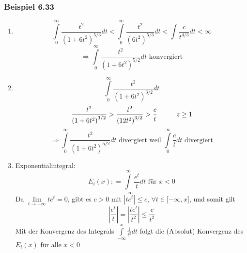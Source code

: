 \subsubsection*{Beispiel 6.33}
\begin{enumerate}
\item \[\int\limits_0^\infty  {\frac{{{t^2}}}{{{{\left( {1 + 6{t^2}} \right)}^{5/3}}}}dt}  < \int\limits_0^\infty  {\frac{{{t^2}}}{{{{\left( {6{t^2}} \right)}^{5/3}}}}dt}  < \int {\frac{c}{{{t^{4/3}}}}dt < \infty } \]
$$\Rightarrow\int\limits_0^\infty  {\frac{{{t^2}}}{{{{\left( {1 + 6{t^2}} \right)}^{5/2}}}}dt} \text{ konvergiert}$$
\item \[\int\limits_0^\infty  {\frac{{{t^2}}}{{{{\left( {1 + 6{t^2}} \right)}^{3/2}}}}dt} \]   
\[\frac{{{t^2}}}{{{{\left( {1 + 6{t^2}} \right)}^{3/2}}}} > \frac{{{t^2}}}{{{{\left( {12{t^2}} \right)}^{3/2}}}} > \frac{c}{t}\text{\hspace{10mm}}z\geq 1\]
\[\Rightarrow\int\limits_0^\infty  {\frac{{{t^2}}}{{{{\left( {1 + 6{t^2}} \right)}^{5/2}}}}} dt\text{ divergiert weil }\int\limits_0^\infty  {\frac{c}{t}} dt\text{ divergiert}\]
\item Exponentialintegral:
\[{E_i}(x): = \int\limits_{ - \infty }^\infty  {\frac{{{e^t}}}{t}dt} \text{ für }x<0\]
Da $\mathop {\lim }\limits_{t \to  - \infty } t{e^t} = 0$, gibt es $c>0$ mit $\left| {t{e^t}} \right| \le c$, $\forall t\in\lbrack -\infty ,x\rbrack$, und somit gilt \[\left| {\frac{{{e^t}}}{t}} \right| = \left| {\frac{{t{e^t}}}{{{t^2}}}} \right| \le \frac{c}{{{t^2}}}\] Mit der Konvergenz des Integrals $\int\limits_{ - \infty }^x {\frac{1}{{{t^2}}}dt} $ folgt die (Absolut) Konvergenz des $E_i(x)$ für alle $x<0$
\end{enumerate}


